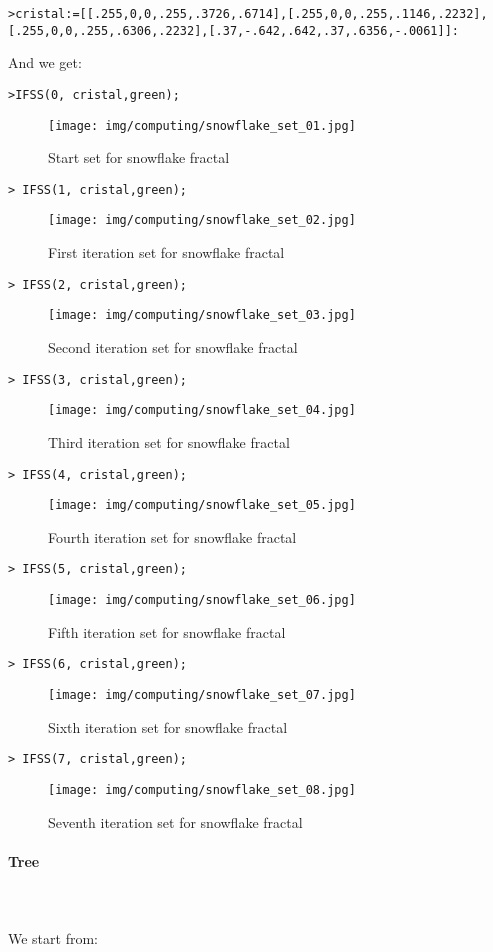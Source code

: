 	\texttt{>cristal:=[[.255,0,0,.255,.3726,.6714],[.255,0,0,.255,.1146,.2232], }
	\texttt{[.255,0,0,.255,.6306,.2232],[.37,-.642,.642,.37,.6356,-.0061]]:}

	And we get:
	
	\texttt{>IFSS(0, cristal,green);}
	\begin{figure}[H]
		\centering
		\texttt{[image: img/computing/snowflake\_set\_01.jpg]}
		\caption[]{Start set for snowflake fractal}
	\end{figure}
	\texttt{> IFSS(1, cristal,green);}
	\begin{figure}[H]
		\centering
		\texttt{[image: img/computing/snowflake\_set\_02.jpg]}
		\caption[]{First iteration set for snowflake fractal}
	\end{figure}
	\texttt{> IFSS(2, cristal,green);}
	\begin{figure}[H]
		\centering
		\texttt{[image: img/computing/snowflake\_set\_03.jpg]}
		\caption[]{Second iteration set for snowflake fractal}
	\end{figure}
	\texttt{> IFSS(3, cristal,green);}
	\begin{figure}[H]
		\centering
		\texttt{[image: img/computing/snowflake\_set\_04.jpg]}
		\caption[]{Third iteration set for snowflake fractal}
	\end{figure}
	\texttt{> IFSS(4, cristal,green);}
	\begin{figure}[H]
		\centering
		\texttt{[image: img/computing/snowflake\_set\_05.jpg]}
		\caption[]{Fourth iteration set for snowflake fractal}
	\end{figure}
	\texttt{> IFSS(5, cristal,green);}
	\begin{figure}[H]
		\centering
		\texttt{[image: img/computing/snowflake\_set\_06.jpg]}
		\caption[]{Fifth iteration set for snowflake fractal}
	\end{figure}
	\texttt{> IFSS(6, cristal,green);}
	\begin{figure}[H]
		\centering
		\texttt{[image: img/computing/snowflake\_set\_07.jpg]}
		\caption[]{Sixth iteration set for snowflake fractal}
	\end{figure}
	\texttt{> IFSS(7, cristal,green);}
	\begin{figure}[H]
		\centering
		\texttt{[image: img/computing/snowflake\_set\_08.jpg]}
		\caption[]{Seventh iteration set for snowflake fractal}
	\end{figure}
	
	\pagebreak
	\paragraph{Tree}\mbox{}\\\\
	We start from:
	
